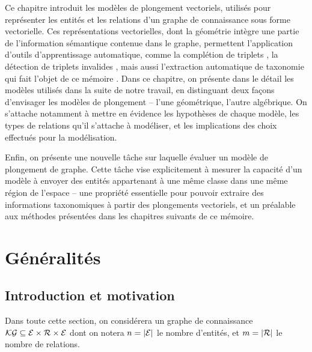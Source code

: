 \label{chap:kge}

Ce chapitre introduit les modèles de plongement vectoriels, utilisés pour représenter les entités et les relations d'un graphe de connaissance sous forme vectorielle. Ces représentations vectorielles, dont la géométrie intègre une partie de l'information sémantique contenue dans le graphe, permettent l'application d'outils d'apprentissage automatique, comme la complétion de triplets \cite{simple2018}, la détection de triplets invalides \cite{nguyen2020relational}, mais aussi l'extraction automatique de taxonomie qui fait l'objet de ce mémoire \cite{ristoski2017large, zhang2018taxogen}. Dans ce chapitre, on présente dans le détail les modèles utilisés dans la suite de notre travail, en distinguant deux façons d'envisager les modèles de plongement – l'une géométrique, l'autre algébrique. On s'attache notamment à mettre en évidence les hypothèses de chaque modèle, les types de relations qu'il s'attache à modéliser, et les implications des choix effectués pour la modélisation. %

Enfin, on présente une nouvelle tâche sur laquelle évaluer un modèle de plongement de graphe. Cette tâche vise explicitement à mesurer la capacité d'un modèle à envoyer des entités appartenant à une même classe dans une même région de l'espace – une propriété essentielle pour pouvoir extraire des informations taxonomiques à partir des plongements vectoriels, et un préalable aux méthodes présentées dans les chapitres suivants de ce mémoire.


\section{Généralités}
\label{sec:kge-general}


\subsection{Introduction et motivation}
\label{subsec:kge-general-intro}



Dans toute cette section, on considérera un graphe de connaissance $\mathcal{KG} \subseteq \mathcal{E} \times \mathcal{R} \times \mathcal{E}$ dont on notera $n = | \mathcal{E} |$ le nombre d'entités, et $m = |\mathcal{R} |$ le nombre de relations.


